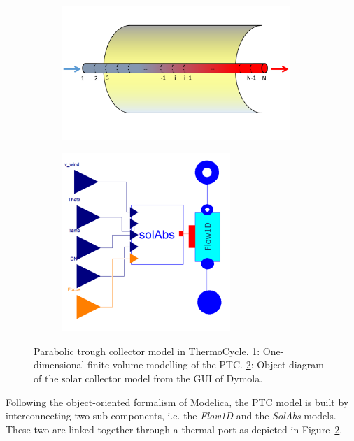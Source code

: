 \documentclass[final,3p,times,review]{elsarticle}
\begin{document}
\begin{figure}[h]
	\centering
	\begin{subfigure}[b]{0.48\textwidth}
		\centering
		\includegraphics[width=0.95\textwidth]{Figures/PTC_FV.pdf}
		\caption{}
		\label{fig:PTC_FV}	
	\end{subfigure}
	\begin{subfigure}[b]{0.48\textwidth}
		\centering
		\includegraphics[width=0.7\textwidth]{Figures/PTC_GUI}
		\caption{}
		\label{fig:PTC_GUI}
	\end{subfigure}
	\caption{Parabolic trough collector model in ThermoCycle. \ref{fig:PTC_FV}: One-dimensional finite-volume modelling of the PTC. \ref{fig:PTC_GUI}: Object diagram of the solar collector model from the GUI of Dymola.}
	\label{fig:PTC_model}
\end{figure}
%
Following the object-oriented formalism of Modelica, the PTC model is built by interconnecting two sub-components, i.e. the \textit{Flow1D} and the \textit{SolAbs} models. These two are linked together through a thermal port as depicted in Figure~\ref{fig:PTC_GUI}.\\
\end{document}
